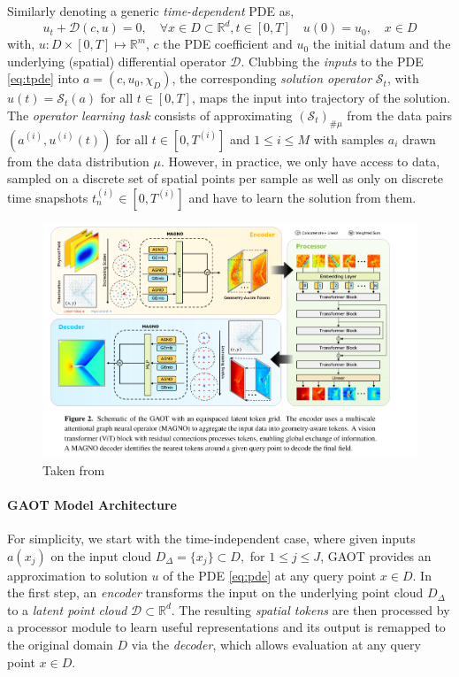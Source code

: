 \documentclass[reqno,10pt]{amsart}
\theoremstyle{plain}
\theoremstyle{definition}
\newcommand{\bb}[1]{\mathbb{#1}}
\newcommand{\cal}[1]{\mathcal{#1}}
\begin{document}
\noindent Similarly denoting a generic {\it time-dependent} PDE as,
\begin{equation}\label{eq:tpde}
    u_t + \cal D(c,u) = 0, \quad \forall x \in D \subset \bb R^d, t \in [0,T] \quad u(0) = u_0, \quad x\in D
\end{equation}
with, $u : D \times [0,T] \mapsto \bb R^m$, $c$ the PDE coefficient and $u_0$ the initial datum and the underlying (spatial) differential operator $\cal D$. Clubbing the {\it inputs} to the PDE \ref{eq:tpde} into $a = (c,u_0,\chi_D)$, the corresponding {\it solution operator} $\cal S_t$, with $u(t) = \cal S_t(a)$ for all $t \in [0,T]$, maps the input into trajectory of the solution. The {\it operator learning task} consists of approximating $(\cal S_t)_{\#\mu}$ from the data pairs $(a^{(i)}, u^{(i)}(t))$ for all $t \in [0,T^{(i)}]$ and $1 \leq i \leq M$ with samples $a_i$ drawn from the data distribution $\mu$. However, in practice, we only have access to data, sampled on a discrete set of spatial points per sample as well as only on discrete time snapshots $t^{(i)}_n \in [0,T^{(i)}]$ and have to learn the solution from them.

\begin{figure}[!ht]
    \centering
    \includegraphics[width=\textwidth]{gaot_arch.png}
    \caption{Taken from \cite{SW2025}}
    \label{fig:gaot_arch}
\end{figure}

\paragraph{\bf GAOT Model Architecture} 
For simplicity, we start with the time-independent case, where given inputs $a(x_j)$ on the input cloud $D_\Delta = \{x_j\} \subset D,$ for $1 \leq j \leq J$, GAOT provides an approximation to solution $u$ of the PDE \ref{eq:pde} at any query point $x\in D$. In the first step, an {\it encoder} transforms the input on the underlying point cloud $D_\Delta$ to a {\it latent point cloud} $\cal D \subset \bb R^d$. The resulting {\it spatial tokens} are then processed by a processor module to learn useful representations and its output is remapped to the original domain $D$ via the {\it decoder}, which allows evaluation at any query point $x \in D$.
\end{document}

